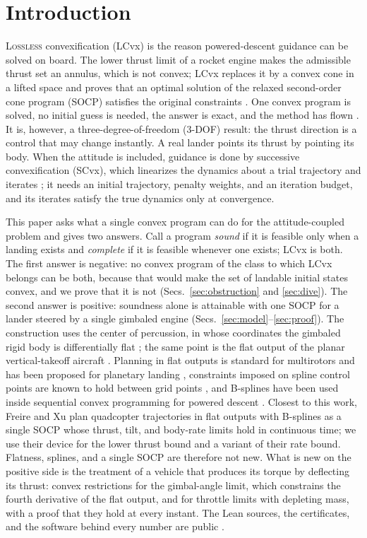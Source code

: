 \section{Introduction}
\lettrine{L}{ossless} convexification (LCvx) is the reason powered-descent guidance can be solved on board. The lower thrust
limit of a rocket engine makes the admissible thrust set an annulus, which is not convex; LCvx replaces it by a convex cone in
a lifted space and proves that an optimal solution of the relaxed second-order cone program (SOCP) satisfies the original
constraints \cite{acikmese2007,acikmese2011,acikmese2013}. One convex program is solved, no initial guess is needed, the
answer is exact, and the method has flown \cite{malyuta2022}. It is, however, a three-degree-of-freedom (3-DOF) result: the
thrust direction is a control that may change instantly. A real lander points its thrust by pointing its body. When the
attitude is included, guidance is done by successive convexification (SCvx), which linearizes the dynamics about a trial
trajectory and iterates \cite{mao2016,szmuk2018,szmuk2020}; it needs an initial trajectory, penalty weights, and an iteration
budget, and its iterates satisfy the true dynamics only at convergence.

This paper asks what a single convex program can do for the attitude-coupled problem and gives two answers. Call a program
\emph{sound} if it is feasible only when a landing exists and \emph{complete} if it is feasible whenever one exists; LCvx is
both. The first answer is negative: no convex program of the class to which LCvx belongs can be both, because that would
make the set of landable initial states convex, and we prove that it is not (Secs.~\ref{sec:obstruction} and \ref{sec:dive}).
The second answer is positive: soundness alone is attainable with one SOCP for a lander steered by a single gimbaled engine
(Secs.~\ref{sec:model}--\ref{sec:proof}). The construction uses the center of percussion, in whose coordinates the gimbaled
rigid body is differentially flat \cite{fliess1995}; the same point is the flat output of the planar vertical-takeoff
aircraft \cite{martin1996}. Planning in flat outputs is standard for multirotors \cite{mellinger2011} and has been proposed
for planetary landing \cite{desiderio2013}, constraints imposed on spline control points are known to hold between grid
points \cite{vanloock2015}, and B-splines have been used inside sequential convex programming for powered descent
\cite{wang2026}. Closest to this work, Freire and Xu \cite{freire2023} plan quadcopter trajectories in flat outputs with
B-splines as a single SOCP whose thrust, tilt, and body-rate limits hold in continuous time; we use their device for the
lower thrust bound and a variant of their rate bound. Flatness, splines, and a single SOCP are therefore not new. What is new on the positive
side is the treatment of a vehicle that produces its torque by deflecting its thrust: convex restrictions for the
gimbal-angle limit, which constrains the fourth derivative of the flat output, and for throttle limits with depleting mass,
with a proof that they hold at every instant. The Lean sources, the certificates, and the software behind every number are public
\cite{repo}.

